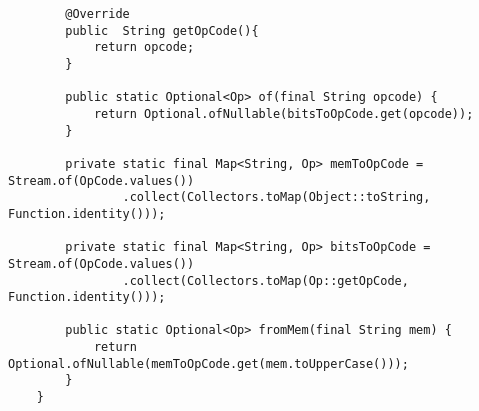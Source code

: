 \documentclass[12pt]{extarticle}
\begin{document}
\begin{enumerate}
\begin{lstlisting}
        @Override
        public  String getOpCode(){
            return opcode;
        }
    
        public static Optional<Op> of(final String opcode) {
            return Optional.ofNullable(bitsToOpCode.get(opcode));
        }
    
        private static final Map<String, Op> memToOpCode = Stream.of(OpCode.values())
                .collect(Collectors.toMap(Object::toString, Function.identity()));
    
        private static final Map<String, Op> bitsToOpCode = Stream.of(OpCode.values())
                .collect(Collectors.toMap(Op::getOpCode, Function.identity()));
    
        public static Optional<Op> fromMem(final String mem) {
            return Optional.ofNullable(memToOpCode.get(mem.toUpperCase()));
        }
    }
    \end{lstlisting}
    \end{enumerate}
    
\end{document}
